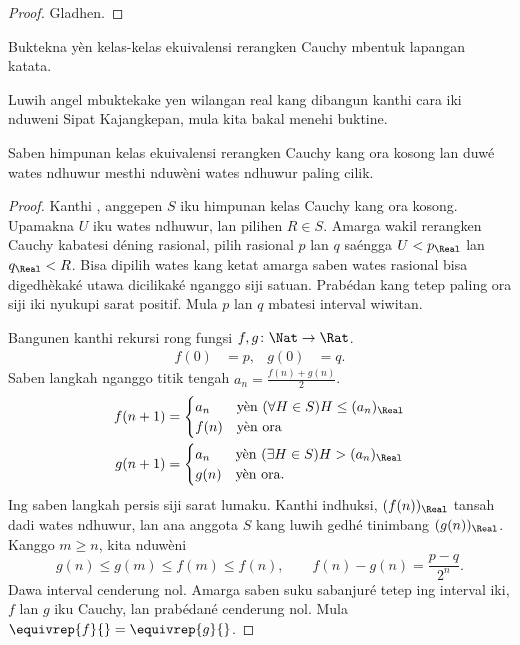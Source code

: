 \documentclass[../../../include/open-logic-section]{subfiles}
\begin{document}
\begin{proof}
Gladhen.
\end{proof}

\begin{prob}
Buktekna yèn kelas-kelas ekuivalensi rerangken Cauchy mbentuk lapangan katata.
\end{prob}

Luwih angel mbuktekake yen wilangan real kang dibangun kanthi cara iki
nduweni Sipat Kajangkepan, mula kita bakal menehi buktine.

\begin{thm}
Saben himpunan kelas ekuivalensi rerangken Cauchy kang ora kosong lan
duwé wates ndhuwur mesthi nduwèni wates ndhuwur paling cilik.
\end{thm}

\begin{proof}
Kanthi , anggepen $S$ iku himpunan kelas Cauchy kang ora kosong.
Upamakna $U$ iku wates ndhuwur, lan pilihen $R\in S$. Amarga wakil
rerangken Cauchy kabatesi déning rasional, pilih rasional $p$ lan $q$
saéngga $U<p_\Real$ lan $q_\Real<R$. Bisa dipilih wates kang ketat
amarga saben wates rasional bisa digedhèkaké utawa dicilikaké nganggo
siji satuan. Prabédan kang tetep paling ora siji iki nyukupi sarat
positif. Mula $p$ lan $q$ mbatesi interval wiwitan.

Bangunen kanthi rekursi rong fungsi $f,g\colon\Nat\to\Rat$.
\begin{align*}
 f(0)&=p, & g(0)&=q.
\end{align*}
Saben langkah nganggo titik tengah $a_n=\frac{f(n)+g(n)}{2}$.
\begin{align*}
 f(n+1)&=
 \begin{cases}
  a_n &\text{yèn }(\forall H\in S)H\leq(a_n)_\Real\\
  f(n)&\text{yèn ora}
 \end{cases}\\
 g(n+1)&=
 \begin{cases}
  a_n &\text{yèn }(\exists H\in S)H>(a_n)_\Real\\
  g(n)&\text{yèn ora}.
 \end{cases}
\end{align*}
Ing saben langkah persis siji sarat lumaku. Kanthi indhuksi,
$(f(n))_\Real$ tansah dadi wates ndhuwur, lan ana anggota $S$ kang
luwih gedhé tinimbang $(g(n))_\Real$. Kanggo $m\geq n$, kita nduwèni
\[
 g(n)\leq g(m)\leq f(m)\leq f(n),\qquad f(n)-g(n)=\frac{p-q}{2^n}.
\]
Dawa interval cenderung nol. Amarga saben suku sabanjuré tetep
ing interval iki, $f$ lan $g$ iku Cauchy, lan prabédané cenderung
nol. Mula $\equivrep{f}{}=\equivrep{g}{}$.


\end{proof}
\end{document}
